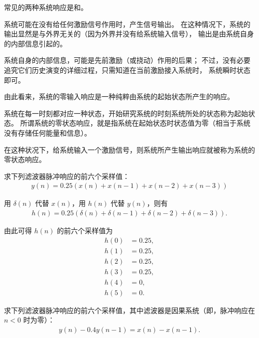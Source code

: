 常见的两种系统响应是和。

\begin{definition}[零输入响应]
    系统可能在没有给任何激励信号作用时，产生信号输出。
    在这种情况下，系统的输出显然是与外界无关的（因为外界并没有给系统输入信号），
    输出是由系统自身的内部信息引起的。

    系统自身的内部信息，可能是先前激励（或挠动）作用的后果；
    不过，没有必要追究它们历史演变的详细过程，只需知道在当前激励接入系统时，
    系统瞬时状态即可。

    由此看来，系统的零输入响应是一种纯粹由系统的起始状态所产生的响应。
\end{definition}

\begin{definition}[零状态响应]
    系统在每一时刻都对应一种状态，开始研究系统的时刻系统所处的状态称为起始状态。
    所谓系统的零状态响应，就是指系统在起始状态时状态值为零（相当于系统没有存储任何能量和信息）。

    在这种状况下，给系统输入一个激励信号，则系统所产生输出响应就被称为系统的零状态响应。
\end{definition}

\begin{example}
    求下列滤波器脉冲响应的前六个采样值：
    \begin{align*}
        y(n) = 0.25(x(n) + x(n - 1) + x(n - 2) + x(n - 3))
    \end{align*}
\end{example}

\begin{solution}
    用 $\delta(n)$ 代替 $x(n)$，用 $h(n)$ 代替 $y(n)$，则有
    \begin{align*}
        h(n) = 0.25(\delta(n) + \delta(n - 1) + \delta(n - 2) + \delta(n - 3)).
    \end{align*}

    由此可得 $h(n)$ 的前六个采样值为
    \begin{align*}
        h(0) & = 0.25, \\
        h(1) & = 0.25, \\
        h(2) & = 0.25, \\
        h(3) & = 0.25, \\
        h(4) & = 0, \\
        h(5) & = 0.
    \end{align*}
\end{solution}

\begin{exercise}
    求下列滤波器脉冲响应的前六个采样值，其中滤波器是因果系统（即，脉冲响应在 $n < 0$ 时为零）：
    \begin{align*}
        y(n) - 0.4y(n - 1) = x(n) - x(n - 1).
    \end{align*}
\end{exercise}

